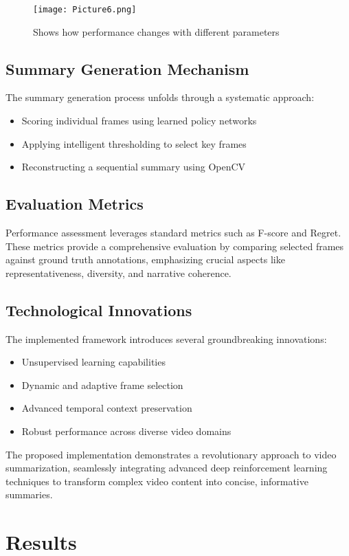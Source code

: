 \documentclass[conference]{IEEEtran}
\begin{document}
\begin{figure}[htbp]
\centerline{\texttt{[image: Picture6.png]}}
\caption{Shows how performance changes with different parameters}
\label{fig}
\end{figure}

\subsection{\textbf{Summary Generation Mechanism}}
The summary generation process unfolds through a systematic approach:
\begin{itemize}
\item Scoring individual frames using learned policy networks
\item Applying intelligent thresholding to select key frames
\item Reconstructing a sequential summary using OpenCV
\end{itemize}

\subsection{\textbf{Evaluation Metrics}}
Performance assessment leverages standard metrics such as F-score and Regret. These metrics provide a comprehensive evaluation by comparing selected frames against ground truth annotations, emphasizing crucial aspects like representativeness, diversity, and narrative coherence.

\subsection{\textbf{Technological Innovations}}
The implemented framework introduces several groundbreaking innovations:
\begin{itemize}
\item Unsupervised learning capabilities
\item Dynamic and adaptive frame selection
\item Advanced temporal context preservation
\item Robust performance across diverse video domains
\end{itemize}
The proposed implementation demonstrates a revolutionary approach to video summarization, seamlessly integrating advanced deep reinforcement learning techniques to transform complex video content into concise, informative summaries.

\section{Results}
\end{document}
